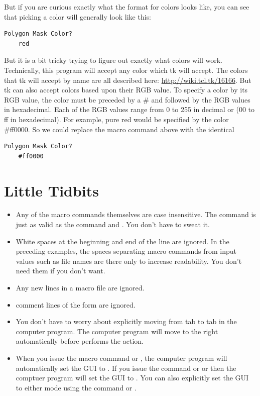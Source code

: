 But if you are curious exactly what the format for
colors looks like, you can see that picking a color
will generally look like this:
\begin{lstlisting}[caption={'Use the Folder Syntax'}]
Polygon Mask Color?
    red
\end{lstlisting}
But it is a bit tricky trying to figure out exactly what 
colors will work. Technically, this program will accept 
any color which tk will accept. The colors that tk
will accept by name are all described here:
\url{http://wiki.tcl.tk/16166}. But tk can also accept
colors based upon their RGB value. To specify a color
by its RGB value, the color must be preceded by a \#
and followed by the RGB values in hexadecimal.
Each of the RGB values range from 0 to 255 in
decimal or (00 to ff in hexadecimal).
For example, pure red would be specified by the color
\#ff0000. So we could replace the macro command above
with the identical
\begin{lstlisting}[caption={'Use the Folder Syntax'}]
Polygon Mask Color?
    #ff0000
\end{lstlisting}

\section{Little Tidbits}\label{Little Tidbits}
\begin{itemize}
    \item Any of the macro commands themselves are case
    insensitive. The command  
    is just as valid as the command 
     and 
    . You don't have to sweat it. 
    \item White spaces at the beginning and end of the 
    line are ignored. In the preceding examples, the
    spaces separating macro commands from input values
    such as file names are there only to increase 
    readability. You don't need them if you don't 
    want.
    \item Any new lines in a macro file are ignored.
    \item comment lines of the form 
     are ignored.
    \item You don't have to worry about explicitly moving 
    from tab to tab in the computer program. The computer 
    program will move to the right automatically before
    performs the action.
    \item When you issue the macro command  
    or , the computer program will
    automatically set the GUI to .
    If you issue the command or  or
     then the comptuer program
    will set the GUI to . You
    can also explicitly set the GUI to either mode using
    the command  or
    .
\end{itemize}


